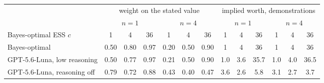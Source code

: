 \begin{tabular}{lcccccccccccc}
\toprule
& \multicolumn{6}{c}{weight on the stated value} & \multicolumn{6}{c}{implied worth, demonstrations} \\
\cmidrule(lr){2-7} \cmidrule(lr){8-13}
& \multicolumn{3}{c}{$n = 1$} & \multicolumn{3}{c}{$n = 4$} & \multicolumn{3}{c}{$n = 1$} & \multicolumn{3}{c}{$n = 4$} \\
\cmidrule(lr){2-4} \cmidrule(lr){5-7} \cmidrule(lr){8-10} \cmidrule(lr){11-13}
Bayes-optimal ESS $c$ & 1 & 4 & 36 & 1 & 4 & 36 & 1 & 4 & 36 & 1 & 4 & 36 \\
\midrule
Bayes-optimal & 0.50 & 0.80 & 0.97 & 0.20 & 0.50 & 0.90 & 1 & 4 & 36 & 1 & 4 & 36 \\
GPT-5.6-Luna, low reasoning & 0.50 & 0.77 & 0.97 & 0.21 & 0.50 & 0.90 & 1.0 & 3.6 & 35.7 & 1.0 & 4.0 & 36.5 \\
GPT-5.6-Luna, reasoning off & 0.79 & 0.72 & 0.88 & 0.43 & 0.40 & 0.47 & 3.6 & 2.6 & 5.8 & 3.1 & 2.7 & 3.7 \\
\bottomrule
\end{tabular}
